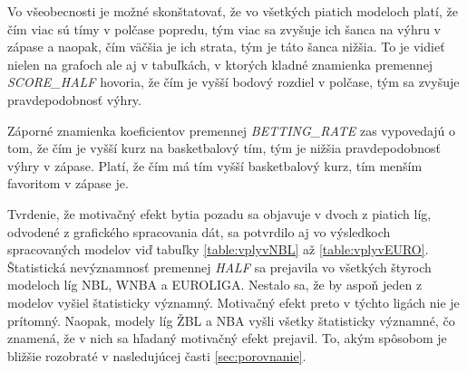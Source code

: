 \documentclass[
  digital, %
  oneside, %
  notable,   %
  lof,     %
  lot,     %
]{fithesis3}
\begin{document}
	Vo všeobecnosti je možné skonštatovať, že vo všetkých piatich modeloch platí, že čím viac sú tímy v polčase popredu, tým viac sa zvyšuje ich šanca na výhru v zápase a naopak, čím väčšia je ich strata, tým je táto šanca nižšia. To je vidieť nielen na grafoch ale aj v tabuľkách, v ktorých kladné znamienka premennej \textit{SCORE\_HALF} hovoria, že čím je vyšší bodový rozdiel v polčase, tým sa zvyšuje pravdepodobnosť výhry.
	
	Záporné znamienka koeficientov premennej \textit{BETTING\_RATE} zas vypovedajú o tom, že čím je vyšší kurz na basketbalový tím, tým je nižšia pravdepodobnosť výhry v zápase. Platí, že čím má tím vyšší basketbalový kurz, tím menším favoritom v zápase je.
	
	Tvrdenie, že motivačný efekt bytia pozadu sa objavuje v dvoch z piatich líg, odvodené z grafického spracovania dát, sa potvrdilo aj vo výsledkoch spracovaných modelov viď tabuľky \ref{table:vplyvNBL} až \ref{table:vplyvEURO}. Štatistická nevýznamnosť premennej \textit{HALF} sa prejavila vo všetkých štyroch modeloch líg NBL, WNBA a EUROLIGA. Nestalo sa, že by aspoň jeden z modelov vyšiel štatisticky významný. Motivačný efekt preto v týchto ligách nie je prítomný. Naopak, modely líg ŽBL a NBA vyšli všetky štatisticky významné, čo znamená, že v nich sa hľadaný motivačný efekt prejavil. To, akým spôsobom je bližšie rozobraté v nasledujúcej časti \ref{sec:porovnanie}.
\end{document}
